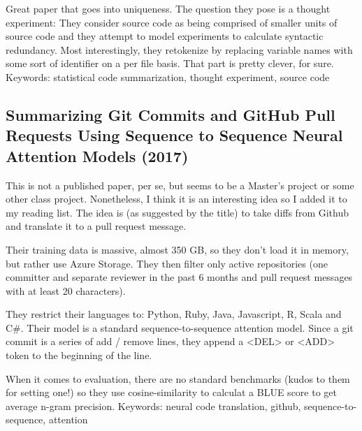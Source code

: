 \documentclass{article}
\begin{document}
Great paper that goes into uniqueness. The question they pose is a thought experiment:
\newline
They consider source code as being comprised of smaller units of source code and they attempt to model experiments to calculate syntactic redundancy. Most interestingly, they retokenize by replacing variable names with some sort of identifier on a per file basis. That part is pretty clever, for sure.
\newline\newline
Keywords: statistical code summarization, thought experiment, source code

\subsection*{Summarizing Git Commits and GitHub Pull Requests Using Sequence to Sequence Neural Attention Models (2017)\cite{zaidi2017summarizing}}

This is not a published paper, per se, but seems to be a Master's project or some other class project. Nonetheless, I think it is an interesting idea so I added it to my reading list. The idea is (as suggested by the title) to take diffs from Github and translate it to a pull request message.

Their training data is massive, almost 350 GB, so they don't load it in memory, but rather use Azure Storage. They then filter only active repositories (one committer and separate reviewer in the past 6 months and pull request messages with at least 20 characters).

They restrict their languages to: Python, Ruby, Java, Javascript, R, Scala and C\#. Their model is a standard sequence-to-sequence attention model. Since a git commit is a series of add / remove lines, they append a <DEL> or <ADD> token to the beginning of the line.

When it comes to evaluation, there are no standard benchmarks (kudos to them for setting one!) so they use cosine-similarity to calculat a BLUE score to get average n-gram precision.
\newline\newline
Keywords: neural code translation, github, sequence-to-sequence, attention
\end{document}
